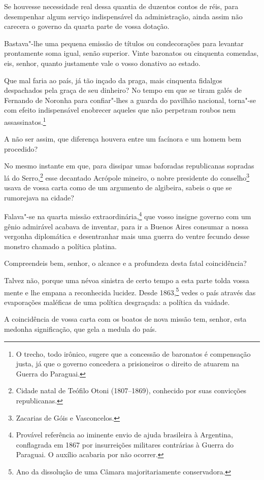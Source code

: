 \begin{linenumbers}
 Se houvesse necessidade real dessa quantia de duzentos contos de réis,
para desempenhar algum serviço indispensável da administração, ainda
assim não carecera o governo da quarta parte de vossa dotação. 

 Bastava"-lhe uma pequena emissão de títulos ou condecorações para
levantar prontamente soma igual, senão superior. Vinte baronatos ou
cinquenta comendas, eis, senhor, quanto justamente vale o vosso
donativo ao estado. 

 Que mal faria ao país, já tão inçado da praga, mais cinquenta fidalgos
despachados pela graça de seu dinheiro? No tempo em que se tiram galés
de Fernando de Noronha para confiar"-lhes a guarda do pavilhão
nacional, torna"-se com efeito indispensável enobrecer aqueles que não
perpetram roubos nem assassinatos.\footnote{ O trecho, todo irônico, sugere 
que a concessão de baronatos é compensação justa, já que o governo concedera 
a prisioneiros o direito de atuarem na Guerra do Paraguai.}
 
A não ser assim, que diferença houvera entre um facínora e um homem bem procedido? 

 No mesmo instante em que, para dissipar umas baforadas republicanas
sopradas lá do Serro,\footnote{ Cidade natal de Teófilo Otoni (1807--1869), 
conhecido por suas convicções republicanas.}
 esse decantado Acrópole mineiro, o nobre presidente do
conselho\footnote{ Zacarias de Góis e Vasconcelos.}
 usava de vossa carta como de um argumento de algibeira, 
sabeis o que se rumorejava na cidade?

 Falava"-se na quarta missão
extraordinária,\footnote{ Provável referência ao iminente envio de ajuda brasileira à Argentina,
conflagrada em 1867 por insurreições militares contrárias à Guerra do
Paraguai. O auxílio acabaria por não ocorrer.}
 que vosso insigne governo com um gênio admirável acabava de inventar,
para ir a Buenos Aires consumar a nossa vergonha diplomática e
desentranhar mais uma guerra do ventre fecundo desse monstro chamado a política platina. 

 Compreendeis bem, senhor, o alcance e a profundeza desta fatal coincidência? 

 Talvez não, porque uma névoa sinistra de certo tempo a esta parte tolda
vossa mente e lhe empana a reconhecida lucidez. Desde
1863,\footnote{ Ano da dissolução de uma Câmara majoritariamente conservadora.}
 vedes o país através das evaporações maléficas de uma política
desgraçada: a política da vaidade.

 A coincidência de vossa carta com os boatos de nova missão tem, senhor,
esta medonha significação, que gela a medula do país.


\end{linenumbers}
